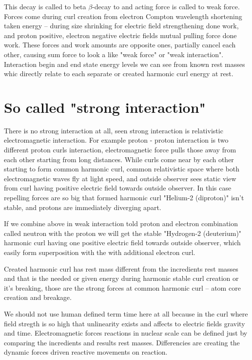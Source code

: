 This decay is called to beta $\beta$-decay to and acting force is called to
weak force. Forces come during curl creation from electron Compton wavelength
shortening taken energy -- during size shrinking for electric field
strengthening done work, and proton positive, electron negative electric fields
mutual pulling force done work. These forces and work amounts are opposite
ones, partially cancel each other, causing sum force to look a like "weak
force" or "weak interaction". Interaction begin and end state energy levels we
can see from known rest masses whic directly relate to each separate or created
harmonic curl energy at rest.

\section{So called "strong interaction"}
\label{strong_interaction}

There is no strong interaction at all, seen strong interaction is relativistic
electromagnetic interaction. For example proton - proton interaction is two
different proton curls interaction, electromagnetic force pulls those away from
each other starting from long distances. While curls come near by each other
starting to form common harmonic curl, common relativistic space where both
electromagnetic waves fly at light speed, and outside observer sees static view
from curl having positive electric field towards outside observer. In this case
repelling forces are so big that formed harmonic curl "Helium-2 (diproton)"
isn't stable, and protons are immediately diverging apart.

If we combine above in weak interaction told proton and electron combination
called neutron with the proton we will get the stable "Hydrogen-2 (deuterium)"
harmonic curl having one positive electric field towards outside observer,
which easily form superposition with the with additional electron curl.

Created harmonic curl has rest mass different from the incredients rest masses
and that is the needed or given energy during harmonic stable curl creation or
it's breaking, those are the strong forces at common harmonic curl -- atom core
creation and breakage.

We should not use human defined term time here at all because in the curl where
field stregth is so high that unlinearity exists and affects to electric fields
gravity and time. Electromagnetic forces reactions in nuclear scale can be
defined just by comparing the incredients and results rest masses. Differencies
are creating the dynamic forces driven reactive movements on reaction.

